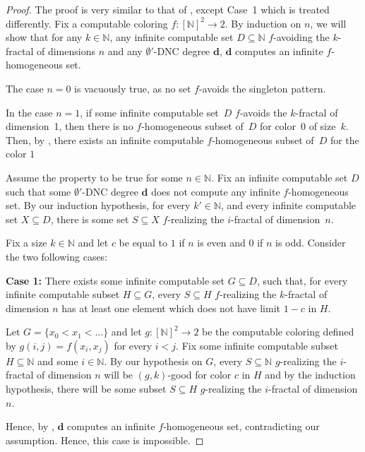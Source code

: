 \documentclass{article}
\numberwithin{theorem}{section}
\newcommand{\ludovic}[1]{\textcolor{blue}{#1}}
\newcommand{\dbf}{\mathbf{d}}
\newcommand{\NN}[0]{\mathbb{N}}
\begin{document}
\begin{proof}
The proof is very similar to that of , except Case~1 which is treated differently.
Fix a computable coloring $f : [\NN]^2 \to 2$.  By induction on $n$, we will show that for any $k \in \NN$, any infinite computable set $D \subseteq \NN$ $f$-avoiding the $k$-fractal of dimensions $n$ and any $\emptyset'$-DNC degree $\dbf$, $\dbf$ computes an infinite $f$-homogeneous set.

The case $n = 0$ is vacuously true, as no set $f$-avoids the singleton pattern.

In the case $n = 1$, if some infinite computable set~$D$ $f$-avoids the $k$-fractal of dimension~1, then there is no $f$-homogeneous subset of~$D$ for color~0 of size~$k$. Then, by , there exists an infinite computable $f$-homogeneous subset of~$D$ for the color $1$


Assume the property to be true for some $n \in \NN$. Fix an infinite computable set $D$ such that some $\emptyset'$-DNC degree $\dbf$ does not compute any infinite $f$-homogeneous set. By our induction hypothesis, for every $k' \in \NN$, and every infinite computable set $X \subseteq D$, there is some set $S \subseteq X$ $f$-realizing the $i$-fractal of dimension~$n$.

Fix a size $k \in \NN$ and let $c$ be equal to $1$ if $n$ is even and $0$ if $n$ is odd. Consider the two following cases:
\smallskip


\textbf{Case 1:} There exists some infinite computable set $G \subseteq D$, such that, for every infinite computable subset $H \subseteq G$, every $S \subseteq H$ $f$-realizing the $k$-fractal of dimension $n$ has at least one element which does not have limit $1-c$ in $H$.

Let $G = \{x_0 < x_1 < \dots \}$ and let $g : [\NN]^2 \to 2$ be the computable coloring defined by $g(i,j) = f(x_i,x_j)$ for every $i < j$. Fix some infinite computable subset $H \subseteq \NN$ and some $i \in \NN$. By our hypothesis on $G$, every $S \subseteq \NN$ $g$-realizing the $i$-fractal of dimension $n$ will be $(g,k)$-good for color $c$ in $H$ 
and by the induction hypothesis, there will be some subset $S \subseteq H$ $g$-realizing the $i$-fractal of dimension $n$.

Hence, by , $\dbf$ computes an infinite $f$-homogeneous set, contradicting our assumption. Hence, this case is impossible.




\end{proof}
\end{document}

